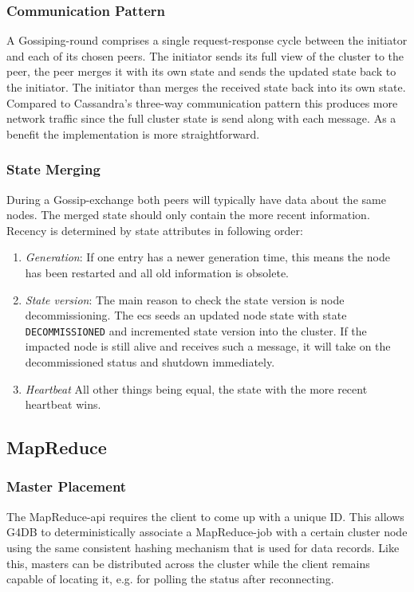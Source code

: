 \subsubsection{Communication Pattern}

A Gossiping-round comprises a single request-response cycle between the initiator and
each of its chosen peers.
The initiator sends its full view of the cluster to the peer, the peer merges it with
its own state and sends the updated state back to the initiator.
The initiator than merges the received state back into its own state.
Compared to Cassandra's three-way communication pattern this produces more network traffic
since the full cluster state is send along with each message.
As a benefit the implementation is more straightforward.

\subsubsection{State Merging}

During a Gossip-exchange both peers will typically have data about the same nodes.
The merged state should only contain the more recent information.
Recency is determined by state attributes in following order:

\begin{enumerate}
	\item \emph{Generation}: If one entry has a newer generation time, this means
		the node has been restarted and all old information is obsolete.
	\item \emph{State version}: The main reason to check the state version is node decommissioning.
		The \ac{ecs} seeds an updated node state with state \texttt{DECOMMISSIONED} and incremented
		state version into the cluster.
		If the impacted node is still alive and receives such a message, it will take on the decommissioned status and shutdown immediately.
	\item \emph{Heartbeat} All other things being equal, the state with the more recent heartbeat wins. 
\end{enumerate}

\subsection{MapReduce}

\subsubsection{Master Placement}
The MapReduce-\acs{api} requires the client to come up with a unique ID.
This allows G4DB to deterministically associate a MapReduce-job with a certain cluster node using the same
consistent hashing mechanism that is used for data records.
Like this, masters can be distributed across the cluster while
the client remains capable of locating it, e.g. for polling the status after reconnecting.

